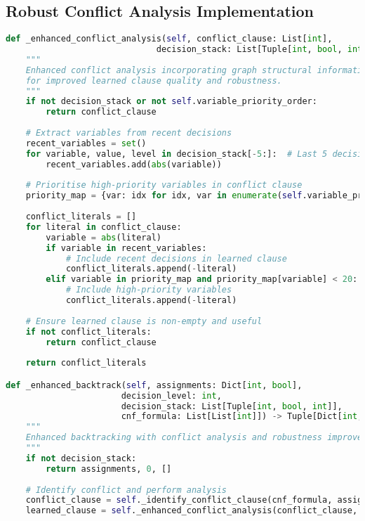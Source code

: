 \subsection{Robust Conflict Analysis Implementation}
\label{appendix:robust-conflict-analysis}

\begin{lstlisting}[language=Python, caption=Robust Conflict Analysis for Consistent Performance]
def _enhanced_conflict_analysis(self, conflict_clause: List[int], 
                              decision_stack: List[Tuple[int, bool, int]]) -> List[int]:
    """
    Enhanced conflict analysis incorporating graph structural information
    for improved learned clause quality and robustness.
    """
    if not decision_stack or not self.variable_priority_order:
        return conflict_clause
    
    # Extract variables from recent decisions
    recent_variables = set()
    for variable, value, level in decision_stack[-5:]:  # Last 5 decisions
        recent_variables.add(abs(variable))
    
    # Prioritise high-priority variables in conflict clause
    priority_map = {var: idx for idx, var in enumerate(self.variable_priority_order)}
    
    conflict_literals = []
    for literal in conflict_clause:
        variable = abs(literal)
        if variable in recent_variables:
            # Include recent decisions in learned clause
            conflict_literals.append(-literal)
        elif variable in priority_map and priority_map[variable] < 20:
            # Include high-priority variables
            conflict_literals.append(-literal)
    
    # Ensure learned clause is non-empty and useful
    if not conflict_literals:
        return conflict_clause
    
    return conflict_literals

def _enhanced_backtrack(self, assignments: Dict[int, bool], 
                       decision_level: int, 
                       decision_stack: List[Tuple[int, bool, int]], 
                       cnf_formula: List[List[int]]) -> Tuple[Dict[int, bool], int, List]:
    """
    Enhanced backtracking with conflict analysis and robustness improvements.
    """
    if not decision_stack:
        return assignments, 0, []
    
    # Identify conflict and perform analysis
    conflict_clause = self._identify_conflict_clause(cnf_formula, assignments)
    learned_clause = self._enhanced_conflict_analysis(conflict_clause, decision_stack)
    

\end{lstlisting}
